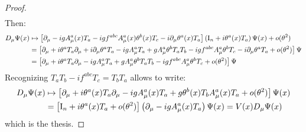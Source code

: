 \begin{proofbox}
\begin{proof}
\begin{equation*}
\begin{split}
      \end{split}
    \end{equation*}
    Then:
    \begin{equation*}
      \begin{split}
        D_\mu \Psi(x)
        & \mapsto \left[ \partial_\mu - i g A_\mu^a(x) T_a - i g f^{abc} A_\mu^a(x) \theta^b(x) T_c - i \partial_\mu \theta^a(x) T_a \right] \left( \mathrm{I}_n + i \theta^a(x) T_a \right) \Psi(x) + o(\theta^2) \\
        & = \left[ \partial_\mu + i \theta^a T_a \partial_\mu + i \partial_\mu \theta^a T_a - i g A_\mu^a T_a + g A_\mu^a \theta^b T_a T_b - i g f^{abc} A_\mu^a \theta^b T_c - i \partial_\mu \theta^a T_a + o(\theta^2) \right] \Psi \\
        & = \left[ \partial_\mu + i \theta^a T_a \partial_\mu - i g A_\mu^a T_a + g A_\mu^a \theta^b T_a T_b - i g f^{abc} A_\mu^a \theta^b T_c + o(\theta^2) \right] \Psi
      \end{split}
    \end{equation*}
    Recognizing $ T_a T_b - i f^{abc} T_c = T_b T_a $ allows to write:
    \begin{equation*}
      \begin{split}
        D_\mu \Psi(x)
        & \mapsto \left[ \partial_\mu + i \theta^a(x) T_a \partial_\mu - i g A_\mu^a(x) T_a + g \theta^b(x) T_b A_\mu^a(x) T_a + o(\theta^2) \right] \Psi(x) \\
        & = \left[ \mathrm{I}_n + i \theta^a(x) T_a + o(\theta^2) \right] \left( \partial_\mu - i g A_\mu^a(x) T_a \right) \Psi(x) = V(x) D_\mu \Psi(x)
      \end{split}
    \end{equation*}
    which is the thesis.
  \end{proof}
\end{proofbox}

